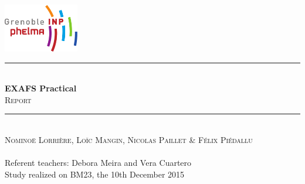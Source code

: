 \begin{titlepage}
    \vspace*{-10px}
    \includegraphics[height=80px]{Images/logo_phelma.pdf}
    \vspace*{-80px}
\begin{flushright}
    \vspace*{60px}
\end{flushright}

\vspace*{0.5cm}
\begin{center}
\rule{\linewidth}{0.5mm}
    \\[0.4cm]
    {\huge \textbf{EXAFS Practical}}
    \\[0.4cm]
    {\huge \textsc{Report}}
    \\[0.4cm]
\rule{\linewidth}{0.5mm}
\\[1cm]

    \LARGE{\textsc{Nominoë Lorrière, Loïc Mangin, Nicolas Paillet \& Félix Piédallu}}
    \\[0.7cm]
    \large{~}%
    \\[1cm]

    \Large{Referent teachers: Debora Meira and Vera Cuartero}\\[1cm]

    \large{Study realized on BM23, the 10th December 2015}\\[2cm]


\end{center}
\end{titlepage}

\tableofcontents        %
\newpage
{}  %

